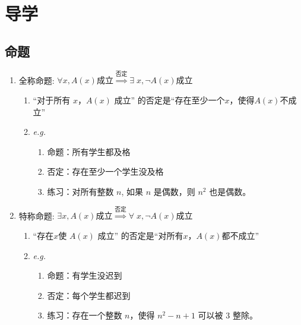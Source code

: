 \documentclass[a4paper,12pt]{article}
\begin{document}


    \section{导学}

    \subsection{命题}

    \begin{enumerate}
        \item 全称命题: $\forall x, A(x) \text{成立} \overset{\text{否定}}{\Rightarrow} \exists \; x, \neg{A(x)}\text{成立}$
        \begin{enumerate}
            \item “对于所有 $x$，$A(x)$ 成立” 的否定是“存在至少一个$x$，使得$A(x)$不成立”
            \item \emph{e.g.}
            \begin{enumerate}
                \item 命题：所有学生都及格
                \item 否定：存在至少一个学生没及格
                \item 练习：对所有整数 $n$, 如果 $n$ 是偶数，则 $n^2$ 也是偶数。
            \end{enumerate}
        \end{enumerate}
        \item 特称命题: $\exists x, A(x) \text{成立} \overset{\text{否定}}{\Rightarrow} \forall \; x, \neg{A(x)}\text{成立}$
        \begin{enumerate}
            \item “存在$x$使 $A(x)$ 成立” 的否定是“对所有$x$，$A(x)$都不成立”
            \item \emph{e.g.}
            \begin{enumerate}
                \item 命题：有学生没迟到
                \item 否定：每个学生都迟到
                \item 练习：存在一个整数 $n$，使得 $n^2 - n + 1$ 可以被 $3$ 整除。
            \end{enumerate}

\end{enumerate}
\end{enumerate}
\end{document}

